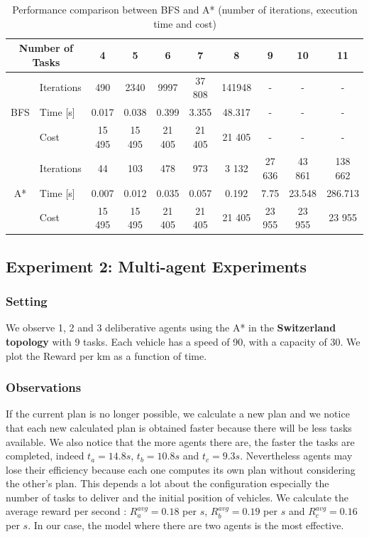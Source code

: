 \documentclass[11pt]{article}
\begin{document}
\begin{table}[ht]
\centering
\begin{tabular}{|c|l||c|c|c|c|c|c|c|c|}
\hline
\multicolumn{2}{|c||}{Number of Tasks} & 4 & 5 & 6 & 7 & 8 & 9 & 10  &  11\\ \hline \hline
\multirow{3}{*}{BFS}  & Iterations & 490 & 2340 & 9997 & 37 808 & 141948 & - & - & - \\ \cline{2-10} 
                   & Time [s] & 0.017 & 0.038 & 0.399 & 3.355 & 48.317 & - & - & - \\ \cline{2-10} 
                   & Cost & 15 495 & 15 495 & 21 405 & 21 405 & 21 405 & - & - & - \\ \hline \hline
\multirow{3}{*}{A*}  & Iterations & 44 & 103 & 478 & 973 & 3 132 & 27 636 & 43 861 & 138 662 \\ \cline{2-10} 
                   & Time [s] & 0.007 & 0.012 & 0.035 & 0.057 & 0.192 & 7.75 & 23.548 & 286.713 \\ \cline{2-10} 
                   & Cost & 15 495 & 15 495 & 21 405 & 21 405 & 21 405 & 23 955 & 23 955 & 23 955 \\ \hline
\end{tabular}
\label{tab:1}\caption{Performance comparison between BFS and A* (number of iterations, execution time and cost)}
\end{table}

\subsection{Experiment 2: Multi-agent Experiments}

\subsubsection{Setting}

We observe 1, 2 and 3 deliberative agents using the A* in the \textbf{Switzerland topology} with 9 tasks. Each vehicle has a speed of 90, with a capacity of 30. We plot the Reward per km as a function of time.

\subsubsection{Observations}
\indent \indent If the current plan is no longer possible, we calculate a new plan and we notice that each new calculated plan is obtained faster because there will be less tasks available. We also notice that the more agents there are, the faster the tasks are completed, indeed $t_a = 14.8s$, $t_b = 10.8s$ and $t_c = 9.3s$. Nevertheless agents may lose their efficiency because each one computes its own plan without considering the other's plan. This depends a lot about the configuration especially the number of tasks to deliver and the initial position of vehicles. We calculate the average reward per second : $R_a^{avg} = 0.18$ per $s$, $R_b^{avg} = 0.19$ per $s$ and $R_c^{avg} = 0.16$ per $s$. In our case, the model where there are two agents is the most effective.
\end{document}

